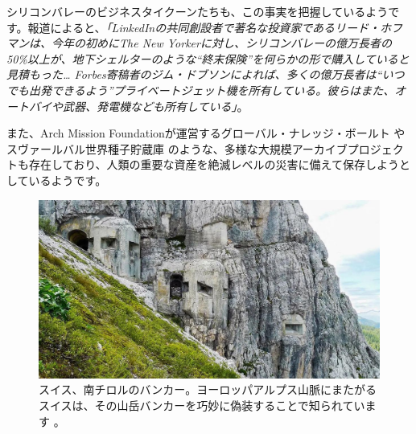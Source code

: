 \documentclass[10pt,twocolumn,letterpaper]{article}
\begin{document}
シリコンバレーのビジネスタイクーンたちも、この事実を把握しているようです。報道によると、\textit{「LinkedInの共同創設者で著名な投資家であるリード・ホフマンは、今年の初めにThe New Yorkerに対し、シリコンバレーの億万長者の50\%以上が、地下シェルターのような“終末保険”を何らかの形で購入していると見積もった… Forbes寄稿者のジム・ドブソンによれば、多くの億万長者は“いつでも出発できるよう”プライベートジェット機を所有している。彼らはまた、オートバイや武器、発電機なども所有している」}\cite{28}。

また、Arch Mission Foundationが運営するグローバル・ナレッジ・ボールト\cite{29} やスヴァールバル世界種子貯蔵庫\cite{30} のような、多様な大規模アーカイブプロジェクトも存在しており、人類の重要な資産を絶滅レベルの災害に備えて保存しようとしているようです。

\begin{figure}[t]
\begin{center}
   \includegraphics[width=1\linewidth]{tyrol.jpg}
\end{center}
   \caption{スイス、南チロルのバンカー。ヨーロッパアルプス山脈にまたがるスイスは、その山岳バンカーを巧妙に偽装することで知られています \cite{32}。}
\label{fig:7}
\label{fig:onecol}
\end{figure}
\end{document}
